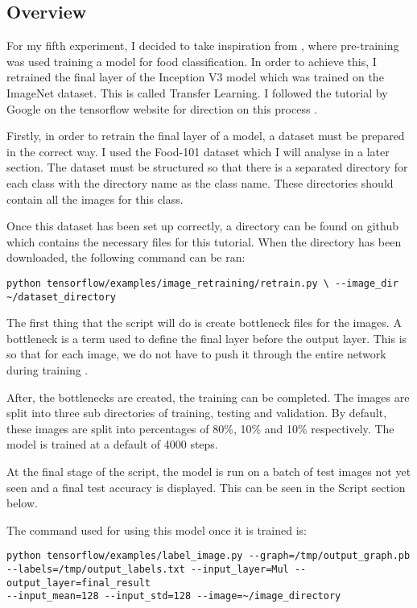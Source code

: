 \subsection*{Overview}
For my fifth experiment, I decided to take inspiration from
\textcite{yanaiFood}, where pre-training was used training a model for food
classification. In order to achieve this, I retrained the final layer of the
Inception V3 model which was trained on the ImageNet dataset. This is called
Transfer Learning. I followed the tutorial by Google on the tensorflow website
for direction on this process \textcite{retrainInception}.

Firstly, in order to retrain the final layer of a model, a dataset must be
prepared in the correct way. I used the Food-101 dataset \textcite{food101}
which I will analyse in a later section. The dataset must be structured so that
there is a separated directory for each class with the directory name as the class
name. These directories should contain all the images for this class. 

Once this dataset has been set up correctly, a directory can be found on github
which contains the necessary files for this tutorial. When the directory has
been downloaded, the following command can be ran:
\begin{lstlisting}
python tensorflow/examples/image_retraining/retrain.py \ --image_dir
~/dataset_directory
\end{lstlisting}

The first thing that the script will do is create bottleneck files for the
images. A bottleneck is a term used to define the final layer before the output
layer. This is so that for each image, we do not have to push it through the
entire network during training \textcite{retrainInception}.

After, the bottlenecks are created, the training can be completed. The images
are split into three sub directories of training, testing and validation. By
default, these images are split into percentages of 80\%, 10\% and 10\%
respectively. The model is trained at a default of 4000 steps. 

At the final stage of the script, the model is run on a batch of test images not
yet seen and a final test accuracy is displayed. This can be seen in the Script
section below.

The command used for using this model once it is trained is:
\begin{lstlisting}
python tensorflow/examples/label_image.py --graph=/tmp/output_graph.pb
--labels=/tmp/output_labels.txt --input_layer=Mul --output_layer=final_result
--input_mean=128 --input_std=128 --image=~/image_directory
\end{lstlisting}

